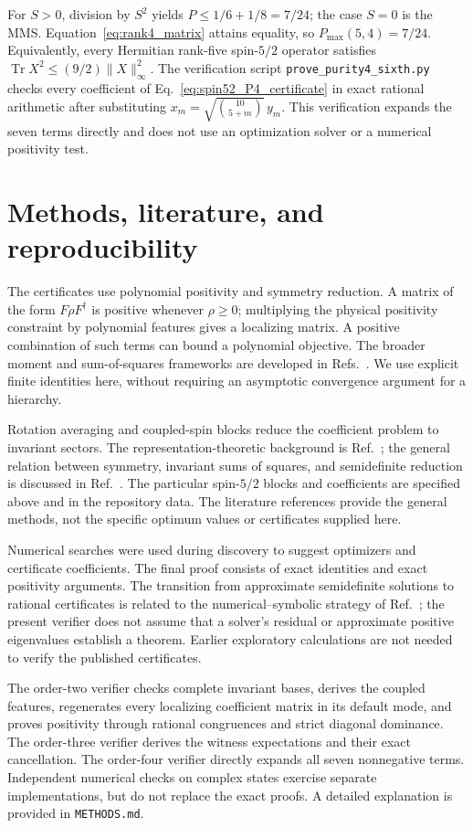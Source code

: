 \documentclass[11pt]{article}
\DeclareMathOperator{\Tr}{Tr}
\begin{document}
For $S>0$, division by $S^2$ yields $P\le1/6+1/8=7/24$;
the case $S=0$ is the MMS. Equation~\eqref{eq:rank4_matrix} attains
equality, so $P_{\max}(5,4)=7/24$. Equivalently, every Hermitian
rank-five spin-$5/2$ operator satisfies
$\Tr X^2\le(9/2)\|X\|_\infty^2$.
The verification script \texttt{prove\_purity4\_sixth.py} checks every
coefficient of Eq.~\eqref{eq:spin52_P4_certificate} in exact rational
arithmetic after substituting $x_m=\sqrt{\binom{10}{5+m}}\,y_m$.
This verification expands the seven terms directly and does not use
an optimization solver or a numerical positivity test.

\section{Methods, literature, and reproducibility}
The certificates use polynomial positivity and symmetry reduction. A matrix of the form $F\rho F^\dagger$ is positive whenever $\rho\ge0$; multiplying the physical positivity constraint by polynomial features gives a localizing matrix. A positive combination of such terms can bound a polynomial objective. The broader moment and sum-of-squares frameworks are developed in Refs.~\cite{Parrilo2000,Lasserre2001}. We use explicit finite identities here, without requiring an asymptotic convergence argument for a hierarchy.

Rotation averaging and coupled-spin blocks reduce the coefficient problem to invariant sectors. The representation-theoretic background is Ref.~\cite{Varshalovich1988}; the general relation between symmetry, invariant sums of squares, and semidefinite reduction is discussed in Ref.~\cite{GatermannParrilo2004}. The particular spin-$5/2$ blocks and coefficients are specified above and in the repository data. The literature references provide the general methods, not the specific optimum values or certificates supplied here.

Numerical searches were used during discovery to suggest optimizers and certificate coefficients. The final proof consists of exact identities and exact positivity arguments. The transition from approximate semidefinite solutions to rational certificates is related to the numerical--symbolic strategy of Ref.~\cite{PeyrlParrilo2008}; the present verifier does not assume that a solver's residual or approximate positive eigenvalues establish a theorem. Earlier exploratory calculations are not needed to verify the published certificates.

The order-two verifier checks complete invariant bases, derives the coupled features, regenerates every localizing coefficient matrix in its default mode, and proves positivity through rational congruences and strict diagonal dominance. The order-three verifier derives the witness expectations and their exact cancellation. The order-four verifier directly expands all seven nonnegative terms. Independent numerical checks on complex states exercise separate implementations, but do not replace the exact proofs. A detailed explanation is provided in \texttt{METHODS.md}.
\end{document}
